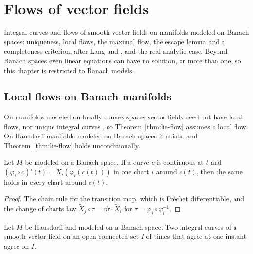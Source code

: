 \chapter{Flows of vector fields}
\label{chap:flows}

Integral curves and flows of smooth vector fields on manifolds modeled on Banach spaces:
uniqueness, local flows, the maximal flow, the escape lemma and a completeness criterion, after
Lang \cite[Ch.~IV]{Lan99} and \cite[\S2.5]{GN26}, and the real analytic case. Beyond Banach
spaces even linear equations can have no solution, or more than one, so this chapter is
restricted to Banach models.

\section{Local flows on Banach manifolds}

On manifolds modeled on locally convex spaces vector fields need not have local flows, nor unique
integral curves \cite[Examples~2.4.2 and 2.4.3]{GN26}, so Theorem~\ref{thm:lie-flow} assumes a
local flow. On Hausdorff manifolds modeled on Banach spaces it exists, and
Theorem~\ref{thm:lie-flow} holds unconditionally.

\begin{lemma}
  \label{lem:integral-curve-chart}
  \leanok
  Let $M$ be modeled on a Banach space. If a curve $c$ is continuous at $t$ and
  $(\varphi_i \circ c)'(t) = \tilde X_i(\varphi_i(c(t)))$ in one chart $i$ around $c(t)$, then the
  same holds in every chart around $c(t)$.
\end{lemma}

\begin{proof}
  \leanok
  The chain rule for the transition map, which is Fr\'echet differentiable, and the change of
  charts law $\tilde X_j \circ \tau = \dd\tau \cdot \tilde X_i$ for $\tau = \varphi_j \circ
  \varphi_i^{-1}$.
\end{proof}

\begin{theorem}
  \label{thm:integral-curve-uniqueness}
  \leanok
  Let $M$ be Hausdorff and modeled on a Banach space. Two integral curves of a smooth vector field
  on an open connected set $I$ of times that agree at one instant agree on $I$.
\end{theorem}

